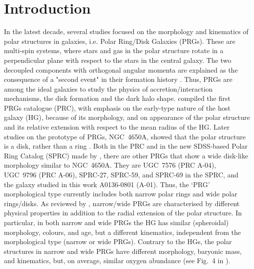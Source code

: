\documentclass[useAMS,usenatbib]{mn2e}
\begin{document}
\section{Introduction} \label{intro}

In the latest decade, several studies focused on the morphology and
kinematics of polar structures in galaxies, i.e. Polar Ring/Disk
Galaxies (PRGs). These are multi-spin systems, where stars and gas in
the polar structure rotate in a perpendicular plane with respect to
the stars in the central galaxy.  The two decoupled components
  with orthogonal angular momenta are explained as the consequence of
a "second event" in their formation history \citep[see][for a
  review]{Iod2014}. Thus, PRGs are among the ideal galaxies to study
the physics of accretion/interaction mechanisms, the disk formation
and the dark halo shape.
%
\citet{Whi90} compiled the first PRGs catalogue (PRC), with emphasis on the early-type nature
of the host galaxy (HG), because of its morphology, and on appearance of the polar structure and its relative extension with respect to the mean radius of the HG.
%
Later studies on the prototype of PRGs, NGC~4650A, showed 
that the polar structure is a disk, rather than a ring \citep[see][]{Arn97,
  Iod02, Gal02, Swa03}. Both in the PRC and in the new SDSS-based
Polar Ring Catalog (SPRC) made by \citet{Moi11}, there are other PRGs
that show a wide disk-like morphology similar to NGC~4650A. They are 
UGC~7576 (PRC A-04), UGC~9796 (PRC A-06), SPRC-27, SPRC-59, and SPRC-69 in the
SPRC, and the galaxy studied in this work A0136-0801 (A-01). Thus, the `PRG' morphological type currently includes both narrow polar rings and wide polar rings/disks. As reviewed by
\citet{Iod2014}, narrow/wide PRGs are characterised by different physical properties in addition to the radial extension of the polar structure.  In particular, in both narrow and wide
PRGs the HG has similar (spheroidal) morphology, colours, and age, but
a different kinematics, independent from the morphological type (narrow or wide
PRGs). Contrary to the HGs, the polar structures in narrow and wide
PRGs have different morphology, baryonic mass, and kinematics, but, on
average, similar oxygen abundance (see Fig.~4 in \citealt{Iod2014}).
\end{document}
